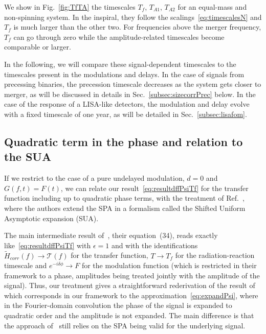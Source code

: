 \documentclass[aps,showpacs,twocolumn,
prd,superscriptaddress,nofootinbib]{revtex4-1}
\newcommand\calT{{\mathcal{T}}}
\newcommand{\Tf}{T_{f}}
\begin{document}
We show in Fig.~\ref{fig:TfTA} the timescales $\Tf$, $T_{A1}$, $T_{A2}$ for an equal-mass and non-spinning system. In the inspiral, they follow the scalings~\eqref{eq:timescalesN} and $\Tf$ is much larger than the other two. For frequencies above the merger frequency, $\Tf$ can go through zero while the amplitude-related timescales become comparable or larger.

In the following, we will compare these signal-dependent timescales to the timescales present in the modulations and delays. In the case of signals from precessing binaries, the precession timescale decreases as the system gets closer to merger, as will be discussed in details in Sec.~\ref{subsec:sizecorrPrec} below. In the case of the response of a LISA-like detectors, the modulation and delay evolve with a fixed timescale of one year, as will be detailed in Sec.~\ref{subsec:lisafom}.


\subsection{Quadratic term in the phase and relation to the SUA}
\label{subsec:resumquadphase}

If we restrict to the case of a pure undelayed modulation, $d=0$ and $G(f,t) = F(t)$, we can relate our result~\eqref{eq:resultdffPsiTf} for the transfer function including up to quadratic phase terms, with the treatment of Ref.~\cite{KCY13, KCY14}, where the authors extend the SPA in a formalism called the Shifted Uniform Asymptotic expansion (SUA).

The main intermediate result of~\cite{KCY14}, their equation~(34), reads exactly like~\eqref{eq:resultdffPsiTf} with $\epsilon=1$ and with the identifications $\tilde{H}_{corr}(f)\rightarrow \calT(f)$ for the transfer function, $T\rightarrow \Tf$ for the radiation-reaction timescale and $e^{-i\delta\phi} \rightarrow F$ for the modulation function (which is restricted in their framework to a phase, amplitudes being treated jointly with the amplitude of the signal). Thus, our treatment gives a straightforward rederivation of the result of~\cite{KCY14} which corresponds in our framework to the approximation~\eqref{eq:expandPsi}, where in the Fourier-domain convolution the phase of the signal is expanded to quadratic order and the amplitude is not expanded. The main difference is that the approach of~\cite{KCY14} still relies on the SPA being valid for the underlying signal.
\end{document}
